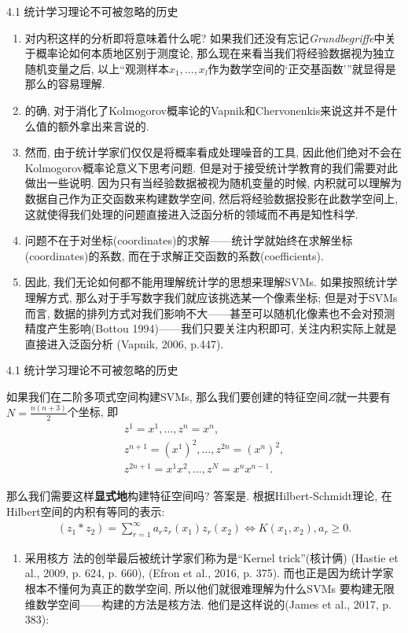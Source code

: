 \documentclass[compress,10pt,dvipsnames,notheorems]{beamer} %
\begin{document}
\begin{frame}{4.1 统计学习理论不可被忽略的历史}
\begin{enumerate}
\item 对内积这样的分析即将意味着什么呢? 如果我们还没有忘记\textit{Grundbegriffe}中关于概率论如何本质地区别于测度论, 那么现在来看当我们将经验数据视为独立随机变量之后, 以上“观测样本$x_{1}, \ldots, x_{l}$作为数学空间的‘正交基函数’”就显得是那么的容易理解. 
\item 的确, 对于消化了Kolmogorov概率论的Vapnik和Chervonenkis来说这并不是什么值的额外拿出来言说的. 
\item 然而, 由于统计学家们仅仅是将概率看成处理噪音的工具, 因此他们绝对不会在Kolmogorov概率论意义下思考问题. 但是对于接受统计学教育的我们需要对此做出一些说明.  因为只有当经验数据被视为随机变量的时候, 内积就可以理解为数据自己作为正交函数来构建数学空间, 然后将经验数据投影在此数学空间上, 这就使得我们处理的问题直接进入泛函分析的领域而不再是知性科学. 
\item 问题不在于对坐标(coordinates)的求解——统计学就始终在求解坐标(coordinates)的系数, 而在于求解正交函数的系数(coefficients). 
\item 因此, 我们无论如何都不能用理解统计学的思想来理解SVMs. 如果按照统计学理解方式, 那么对于手写数字我们就应该挑选某一个像素坐标; 但是对于SVMs而言, 数据的排列方式对我们影响不大——甚至可以随机化像素也不会对预测精度产生影响(Bottou 1994)——我们只要关注内积即可, 关注内积实际上就是直接进入泛函分析 (Vapnik, 2006, p.447).
\end{enumerate}
\end{frame}

\begin{frame}{4.1 统计学习理论不可被忽略的历史}
\begin{solu}
如果我们在二阶多项式空间构建SVMs, 那么我们要创建的特征空间$Z$就一共要有 $N = \frac{n(n+3)}{2}$个坐标, 即
\begin{align*}
z^{1} = x^{1}, \ldots, z^{n} = x^{n}, \\
z^{n+1} = (x^{1})^{2}, \ldots, z^{2n} = (x^{n})^{2}, \\
z^{2n+1} = x^{1}x^{2}, \ldots, z^{N} = x^{n}x^{n-1}.
\end{align*}
\end{solu}
\begin{solu}
那么我们需要这样\textbf{显式地}构建特征空间吗? 答案是{\color{red}{否定的}}. 根据Hilbert-Schmidt理论, 在Hilbert空间的内积有等同的表示:
\begin{align*}
(z_{1} * z_{2}) = \sum_{r=1}^{\infty}a_{r}z_{r}(x_{1})z_{r}(x_{2}) \Longleftrightarrow K(x_{1}, x_{2}), a_{r} \geq 0.
\end{align*}
\end{solu}
\begin{enumerate}
\item 采用核方
法的创举最后被统计学家们称为是“Kernel trick”(核计俩) (Hastie et al., 2009, p.
624, p. 660), (Efron et al., 2016, p. 375). 而也正是因为统计学家根本不懂何为真正的数学空间, 所以他们就很难理解为什么SVMs 要构建无限维数学空间——构建的方法是核方法. 他们是这样说的(James et al., 2017, p. 383):
\end{enumerate}
\end{frame}
\end{document}
